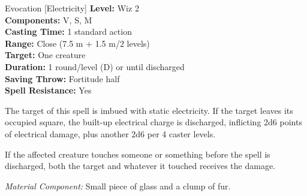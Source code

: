 {Evocation [Electricity]}
{
	\textbf{Level:}
	Wiz 2\\
	\textbf{Components:}
	V, S, M\\
	\textbf{Casting Time:}
	1 standard action\\
	\textbf{Range:}
	Close (7.5 m + 1.5 m/2 levels)\\
	\textbf{Target:}
	One creature\\
	\textbf{Duration:}
	1 round/level (D) or until discharged\\
	\textbf{Saving Throw:}
	Fortitude half\\
	\textbf{Spell Resistance:}
	Yes\\
}
{
	The target of this spell is imbued with static electricity. If the target leaves its occupied square, the built-up electrical charge is discharged, inflicting 2d6 points of electrical damage, plus another 2d6 per 4 caster levels.

	If the affected creature touches someone or something before the spell is discharged, both the target and whatever it touched receives the damage.

	\textit{Material Component:} Small piece of glass and a clump of fur.
}

